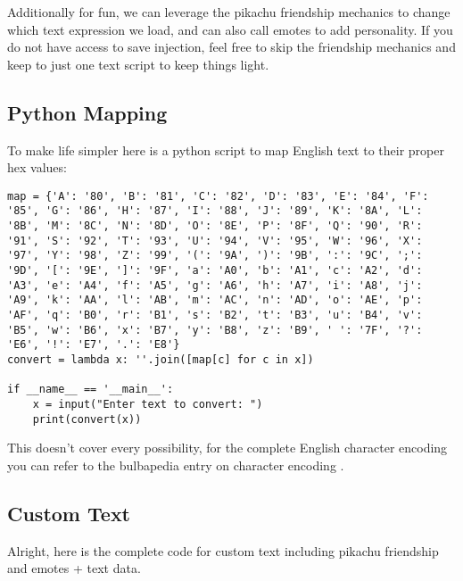 \documentclass[../main.tex]{subfiles}
\begin{document}
    Additionally for fun, we can leverage the pikachu friendship mechanics to change which text expression we load, and can also call emotes to add personality.  If you do not have access to save injection, feel free to skip the friendship mechanics and keep to just one text script to keep things light.

    \subsection{Python Mapping}
    To make life simpler here is a python script to map English text to their proper hex values:

    \begin{verbatim}
map = {'A': '80', 'B': '81', 'C': '82', 'D': '83', 'E': '84', 'F': '85', 'G': '86', 'H': '87', 'I': '88', 'J': '89', 'K': '8A', 'L': '8B', 'M': '8C', 'N': '8D', 'O': '8E', 'P': '8F', 'Q': '90', 'R': '91', 'S': '92', 'T': '93', 'U': '94', 'V': '95', 'W': '96', 'X': '97', 'Y': '98', 'Z': '99', '(': '9A', ')': '9B', ':': '9C', ';': '9D', '[': '9E', ']': '9F', 'a': 'A0', 'b': 'A1', 'c': 'A2', 'd': 'A3', 'e': 'A4', 'f': 'A5', 'g': 'A6', 'h': 'A7', 'i': 'A8', 'j': 'A9', 'k': 'AA', 'l': 'AB', 'm': 'AC', 'n': 'AD', 'o': 'AE', 'p': 'AF', 'q': 'B0', 'r': 'B1', 's': 'B2', 't': 'B3', 'u': 'B4', 'v': 'B5', 'w': 'B6', 'x': 'B7', 'y': 'B8', 'z': 'B9', ' ': '7F', '?': 'E6', '!': 'E7', '.': 'E8'}
convert = lambda x: ''.join([map[c] for c in x])

if __name__ == '__main__':
    x = input("Enter text to convert: ")
    print(convert(x))
    \end{verbatim}

    This doesn't cover every possibility, for the complete English character encoding you can refer to the bulbapedia entry on character encoding \cite{bulbTextEncoding}.

    \subsection{Custom Text}
    Alright, here is the complete code for custom text including pikachu friendship and emotes + text data.
\end{document}
